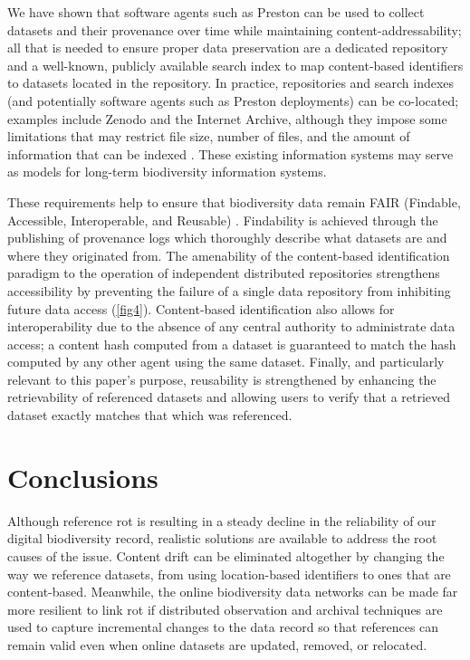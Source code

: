 We have shown that software agents such as Preston can be used to collect datasets and their provenance over time while maintaining content-addressability; all that is needed to ensure proper data preservation are a dedicated repository and a well-known, publicly available search index to map content-based identifiers to datasets located in the repository. In practice, repositories and search indexes (and potentially software agents such as Preston deployments) can be co-located; examples include Zenodo and the Internet Archive, although they impose some limitations that may restrict file size, number of files, and the amount of information that can be indexed \citep{zenodo_2019,archive_2019}. These existing information systems may serve as models for long-term biodiversity information systems. 

These requirements help to ensure that biodiversity data remain FAIR (Findable, Accessible, Interoperable, and Reusable) \citep{Wilkinson_2016}. Findability is achieved through the publishing of provenance logs which thoroughly describe what datasets are and where they originated from. The amenability of the content-based identification paradigm to the operation of independent distributed repositories strengthens accessibility by preventing the failure of a single data repository from inhibiting future data access (\ref{fig4}). Content-based identification also allows for interoperability due to the absence of any central authority to administrate data access; a content hash computed from a dataset is guaranteed to match the hash computed by any other agent using the same dataset. Finally, and particularly relevant to this paper’s purpose, reusability is strengthened by enhancing the retrievability of referenced datasets and allowing users to verify that a retrieved dataset exactly matches that which was referenced. 

\section*{Conclusions} 

Although reference rot is resulting in a steady decline in the reliability of our digital biodiversity record, realistic solutions are available to address the root causes of the issue. Content drift can be eliminated altogether by changing the way we reference datasets, from using location-based identifiers to ones that are content-based. Meanwhile, the online biodiversity data networks can be made far more resilient to link rot if distributed observation and archival techniques are used to capture incremental changes to the data record so that references can remain valid even when online datasets are updated, removed, or relocated.  

